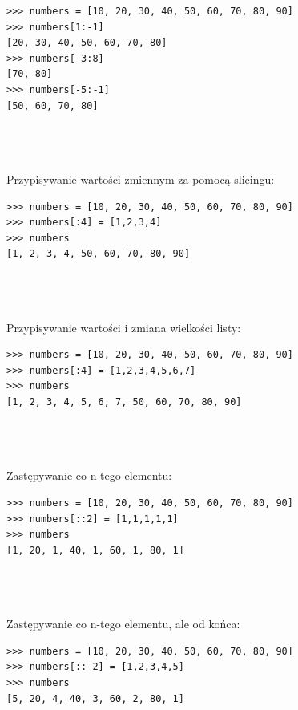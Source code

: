\documentclass[a4paper, 12pt]{article}
\begin{document}
\noindent\begin{minipage}{\linewidth}
\begin{lstlisting}[style=python]
>>> numbers = [10, 20, 30, 40, 50, 60, 70, 80, 90]
>>> numbers[1:-1]
[20, 30, 40, 50, 60, 70, 80]
>>> numbers[-3:8]
[70, 80]
>>> numbers[-5:-1]
[50, 60, 70, 80]
\end{lstlisting}
\end{minipage}
\\ \\ \\
Przypisywanie wartości zmiennym za pomocą slicingu:
\\
\noindent\begin{minipage}{\linewidth}
\begin{lstlisting}[style=python]
>>> numbers = [10, 20, 30, 40, 50, 60, 70, 80, 90]
>>> numbers[:4] = [1,2,3,4]
>>> numbers
[1, 2, 3, 4, 50, 60, 70, 80, 90]
\end{lstlisting}
\end{minipage}
\\ \\ \\
Przypisywanie wartości i zmiana wielkości listy:
\\
\noindent\begin{minipage}{\linewidth}
\begin{lstlisting}[style=python]
>>> numbers = [10, 20, 30, 40, 50, 60, 70, 80, 90]
>>> numbers[:4] = [1,2,3,4,5,6,7]
>>> numbers
[1, 2, 3, 4, 5, 6, 7, 50, 60, 70, 80, 90]
\end{lstlisting}
\end{minipage}
\\ \\ \\
Zastępywanie co n-tego elementu:
\\
\noindent\begin{minipage}{\linewidth}
\begin{lstlisting}[style=python]
>>> numbers = [10, 20, 30, 40, 50, 60, 70, 80, 90]
>>> numbers[::2] = [1,1,1,1,1]
>>> numbers
[1, 20, 1, 40, 1, 60, 1, 80, 1]
\end{lstlisting}
\end{minipage}
\\ \\ \\
Zastępywanie co n-tego elementu, ale od końca:
\\
\noindent\begin{minipage}{\linewidth}
\begin{lstlisting}[style=python]
>>> numbers = [10, 20, 30, 40, 50, 60, 70, 80, 90]
>>> numbers[::-2] = [1,2,3,4,5]
>>> numbers
[5, 20, 4, 40, 3, 60, 2, 80, 1]
\end{lstlisting}
\end{minipage}
\end{document}
